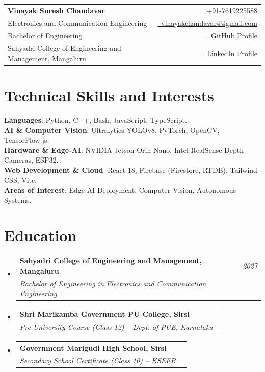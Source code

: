 \documentclass[a4paper,11pt]{article}
\makeatletter
\newcommand{\resumeSubheading}[4]{
\vspace{0.5mm}\item
    \begin{tabular*}{0.98\textwidth}[t]{l@{\extracolsep{\fill}}r}
        \textbf{#1} & \textit{\footnotesize{#4}} \\
        \textit{\footnotesize{#3}} &  \footnotesize{#2}\\
    \end{tabular*}
    \vspace{-2.4mm}
}
\newcommand{\resumeSubHeadingListStart}{\begin{itemize}[leftmargin=*,labelsep=0mm]}
\newcommand{\resumeSubHeadingListEnd}{\end{itemize}\vspace{2mm}}
\newcommand{\name}{Vinayak Suresh Chandavar} %
\newcommand{\course}{Electronics and Communication Engineering} %
\newcommand{\phone}{+91-7619225588} %
\newcommand{\emailb}{vinayakchandavar4@gmail.com} %
\makeatother
\begin{document}
\selectfont

\parbox{\dimexpr\linewidth\relax}{
\begin{tabularx}{\linewidth}{L r} \\
  \textbf{\Large \name} & {\raisebox{0.0\height}{\footnotesize \faPhone}\ \phone}\\
  \course &  \href{mailto:\emailb}{\raisebox{0.0\height}{\footnotesize \faEnvelope}\ {\emailb}}\\
  {Bachelor of Engineering} &  \href{https://github.com/vinayakec69}{\raisebox{0.0\height}{\footnotesize \faGithub}\ {GitHub Profile}} \\
  {Sahyadri College of Engineering and Management, Mangaluru} & \href{https://www.linkedin.com/in/vinayak-chandavar-b1a81732b}{\raisebox{0.0\height}{\footnotesize \faLinkedin}\ {LinkedIn Profile}}
\end{tabularx}
}


\section{\textbf{Technical Skills and Interests}}
 \begin{itemize}[leftmargin = 0.05in, label={}]
    \small{\item{
     \textbf{Languages}{: Python, C++, Bash, JavaScript, TypeScript.} \\
     \textbf{AI \& Computer Vision}{: Ultralytics YOLOv8, PyTorch, OpenCV, TensorFlow.js.} \\
     \textbf{Hardware \& Edge-AI}{: NVIDIA Jetson Orin Nano, Intel RealSense Depth Cameras, ESP32.} \\
     \textbf{Web Development \& Cloud}{: React 18, Firebase (Firestore, RTDB), Tailwind CSS, Vite.} \\
     \textbf{Areas of Interest}{: Edge-AI Deployment, Computer Vision, Autonomous Systems.} \\
    }}
 \end{itemize}
 \vspace{-16pt}


\section{\textbf{Education}}
  \resumeSubHeadingListStart
    \resumeSubheading
      {Sahyadri College of Engineering and Management, Mangaluru} {}
      {Bachelor of Engineering in Electronics and Communication Engineering}{2027}
    \resumeSubheading
      {Shri Marikamba Government PU College, Sirsi}{}
      {Pre-University Course (Class 12) -- Dept. of PUE, Karnataka}{}
    \resumeSubheading
      {Government Marigudi High School, Sirsi}{}
      {Secondary School Certificate (Class 10) -- KSEEB}{}
  \resumeSubHeadingListEnd
\vspace{-5.5mm}
\end{document}

